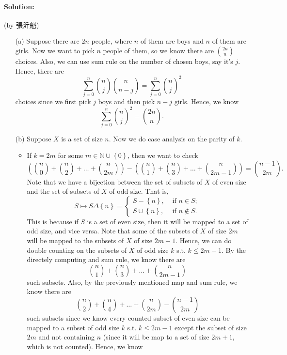 \documentclass[a4paper,12pt]{article}
\begin{document}
\paragraph{Solution:} (by 張沂魁)
\begin{itemize}
	\item[(a)] Suppose there are \(2n\) people, where \(n\) of them are boys and \(n\) of them are girls. Now we want to pick \(n\) people of them, so we know there are \(\binom{2n}{n}\) choices. Also, we can use sum rule on the number of chosen boys, say it's \(j\). Hence, there are 
	\[
		\sum_{j=0}^n \binom{n}{j} \binom{n}{n - j} = \sum_{j=0}^n \binom{n}{j}^2 
	\]   choices since we first pick \(j\) boys and then pick \(n - j\) girls. Hence, we know 
	\[
		\sum_{j=0}^n \binom{n}{j}^2 = \binom{2n}{n}.
	\] 
	\item[(b)] Suppose \(X\) is a set of size \(n\). Now we do case analysis on the parity of \(k\).
	\begin{itemize}
		\item If \(k = 2m\) for some \(m \in \mathbb{N} \cup \left\{ 0 \right\}  \), then we want to check 
		\[
			\left( \binom{n}{0} + \binom{n}{2} + \dots + \binom{n}{2m} \right) - \left( \binom{n}{1} + \binom{n}{3} + \dots + \binom{n}{2m-1} \right) = \binom{n - 1}{2m}.
		\]
		Note that we have a bijection between the set of subsets of \(X\) of even size and the set of subsets of \(X\) of odd size. That is, 
		\[
			S \mapsto S \Delta \left\{ n \right\} = \begin{cases}
				S - \left\{ n \right\} , &\text{ if } n \in S ;\\
				S \cup \left\{ n \right\} , &\text{ if } n \notin S.
			\end{cases}
		\]  
		This is because if \(S\) is a set of even size, then it will be mapped to a set of odd size, and vice versa. Note that some of the subsets of \(X\) of size \(2m\) will be mapped to the subsets of \(X\) of size \(2m + 1\). Hence, we can do double counting on the subsets of \(X\) of odd size \(k\) s.t. \(k \le 2m - 1\). By the directely computing and sum rule, we know there are 
		\[
			\binom{n}{1} + \binom{n}{3} + \dots + \binom{n}{2m - 1}
		\] such subsets. Also, by the previously mentioned map and sum rule, we know there are 
		\[
			\binom{n}{2} + \binom{n}{4} + \dots + \binom{n}{2m} - \binom{n - 1}{2m}
		\] such subsets since we know every counted subset of even size can be mapped to a subset of odd size \(k\) s.t. \(k \le 2m - 1\) except the subset of size \(2m\) and not containing \(n\) (since it will be map to a set of size \(2m + 1\), which is not counted). Hence, we know 

\end{itemize}
\end{itemize}
\end{document}
